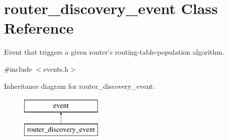 \hypertarget{classrouter__discovery__event}{\section{router\-\_\-discovery\-\_\-event Class Reference}
\label{classrouter__discovery__event}
}


Event that triggers a given router's routing-\/table-\/population algorithm.  




{\ttfamily \#include $<$events.\-h$>$}

Inheritance diagram for router\-\_\-discovery\-\_\-event\-:\begin{figure}[H]
\begin{center}
\leavevmode
\includegraphics[height=2.000000cm]{classrouter__discovery__event}
\end{center}
\end{figure}
